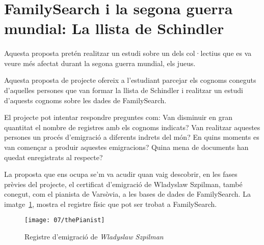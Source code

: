 \section{FamilySearch i la segona guerra mundial: La llista de Schindler}

    \paragraph{}
    Aquesta proposta pretén realitzar un estudi sobre un dels col·lectius que es va veure més afectat durant la segona guerra mundial, els jueus.

    Aquesta proposta de projecte ofereix a l'estudiant parcejar els cognoms coneguts d'aquelles persones que van formar la llista de Schindler i realitzar un estudi d'aquests cognoms sobre les dades de FamilySearch.

    El projecte pot intentar respondre preguntes com: Van disminuir en gran quantitat el nombre de registres amb els cognoms indicats? Van realitzar aquestes persones un procés d'emigració a diferents indrets del món? En quins moments es van començar a produir aquestes emigracions? Quina mena de documents han quedat enregistrats al respecte?

    La proposta que ens ocupa se'm va acudir quan vaig descobrir, en les fases prèvies del projecte, el certificat d'emigració de Wladyslaw Szpilman, també conegut, com el pianista de Varsòvia, a les bases de dades de FamilySearch. La imatge~\ref{fig:thePianist}, mostra el registre físic que pot ser trobat a FamilySearch.

    \begin{figure}[h]
        \texttt{[image: 07/thePianist]}
        \centering
        \caption{Registre d'emigració de \emph{Wladyslaw Szpilman}\label{fig:thePianist}}
    \end{figure}
